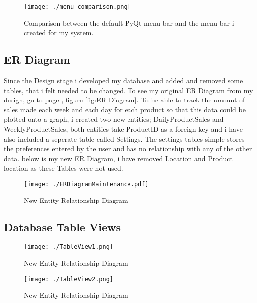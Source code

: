 \begin{figure}[H]
    \texttt{[image: ./menu-comparison.png]}
    \caption{Comparison between the default PyQt menu bar and the menu bar i created for my system.} \label{fig:menu-comparison}
\end{figure}




\pagebreak

\subsection{ER Diagram}

Since the Design stage i developed my database and added and removed some tables, that i felt needed to be changed. To see my original ER Diagram from my design, go to page \pageref{fig:ER Diagram}, figure \ref{fig:ER Diagram}. To be able to track the amount of sales made each week and each day for each product so that this data could be plotted onto a graph, i created two new entities; DailyProductSales and WeeklyProductSales, both entities take ProductID as a foreign key and i have also included a seperate table called Settings. The settings tables simple stores the preferences entered by the user and has no relationship with any of the other data. below is my new ER Diagram, i have removed Location and Product location as these Tables were not used.

\begin{figure}[H]
    \texttt{[image: ./ERDiagramMaintenance.pdf]}
    \caption{New Entity Relationship Diagram} \label{fig:entity-relationship-maintenance}
\end{figure}

\pagebreak

\subsection{Database Table Views}

\begin{figure}[H]
    \texttt{[image: ./TableView1.png]}
    \caption{New Entity Relationship Diagram} \label{fig:table-view-1}
\end{figure}

\begin{figure}[H]
    \texttt{[image: ./TableView2.png]}
    \caption{New Entity Relationship Diagram} \label{fig:table-view-2}
\end{figure}

